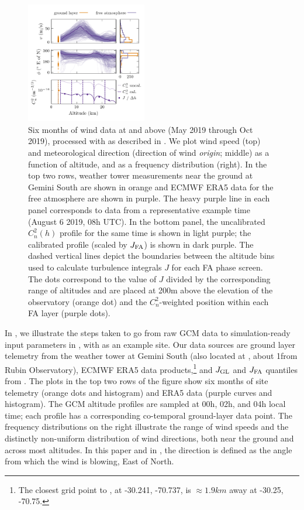 \documentclass[twocolumn,twocolappendix]{openjournal}
\begin{document}
\begin{figure}
\includegraphics[width=0.47\textwidth]{f2_data.png}
\caption{
    Six months of wind data at and above \cp (May 2019 through  Oct 2019), processed with \psfws as described in .
    We plot wind speed (top) and meteorological direction (direction of wind \textsl{origin}; middle) as a function of altitude, and as a frequency distribution (right). 
    In the top two rows, weather tower measurements near the ground at Gemini South are shown in orange and ECMWF ERA5 data for the free atmosphere are shown in purple.
    The heavy purple line in each panel corresponds to data from a representative example time (August 6 2019, 08h UTC).
    In the bottom panel, the uncalibrated $C_n^2(h)$ profile for the same time is shown in light purple; the calibrated profile (scaled by $J_{\rm FA}$) is shown in dark purple. 
    The dashed vertical lines depict the boundaries between the altitude bins used to calculate turbulence integrals $J$ for each FA phase screen.
    The dots correspond to the value of $J$ divided by the corresponding range of altitudes and are placed at 200\unit{m} above the elevation of the observatory (orange dot) and the $C_n^2$-weighted position within each FA layer (purple dots).
    \label{fig:inputs}
    }
\end{figure}

In , we illustrate the steps taken to go from raw GCM data to simulation-ready input parameters in \psfws, with \cp as an example site.
Our data sources are ground layer telemetry from the weather tower at Gemini South (also located at \cp, about 1\km from Rubin Observatory), ECMWF ERA5 data products,\footnote{The closest grid point to \cp, at -30.241, -70.737, is $\approx 1.9\unit{km}$ away at -30.25, -70.75.} and $J_{\rm GL}$ and $J_{\rm FA}$ quantiles from \cite{tokovinin_model_2005}. 
The plots in the top two rows of the figure show six months of site telemetry (orange dots and histogram) and ERA5 data (purple curves and histogram). 
The GCM altitude profiles are sampled at 00h, 02h, and 04h local time; each profile has a corresponding co-temporal ground-layer data point.
The frequency distributions on the right illustrate the range of wind speeds and the distinctly non-uniform distribution of wind directions, both near the ground and across most altitudes.
In this paper and in \psfws, the direction is defined as the angle from which the wind is blowing, East of North. 
\end{document}
